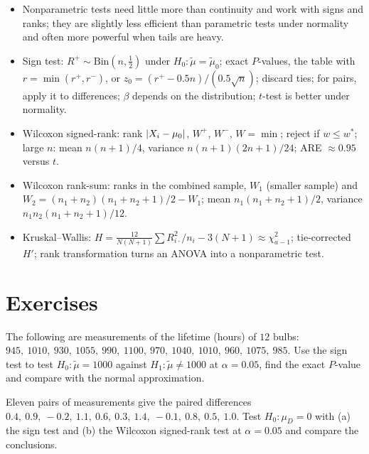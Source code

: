 \begin{summarybox}
\begin{itemize}
  \item Nonparametric tests need little more than continuity and work with signs and ranks; they are slightly less efficient than parametric tests under normality and often more powerful when tails are heavy.
  \item Sign test: $R^+\sim\mathrm{Bin}(n,\tfrac12)$ under $H_0:\tilde\mu=\tilde\mu_0$; exact $P$-values, the table with $r=\min(r^+,r^-)$, or $z_0=(r^+-0.5n)/(0.5\sqrt n)$; discard ties; for pairs, apply it to differences; $\beta$ depends on the distribution; $t$-test is better under normality.
  \item Wilcoxon signed-rank: rank $\lvert X_i-\mu_0\rvert$, $W^+$, $W^-$, $W=\min$; reject if $w\le w^*$; large $n$: mean $n(n+1)/4$, variance $n(n+1)(2n+1)/24$; ARE $\approx0.95$ versus $t$.
  \item Wilcoxon rank-sum: ranks in the combined sample, $W_1$ (smaller sample) and $W_2=(n_1+n_2)(n_1+n_2+1)/2-W_1$; mean $n_1(n_1+n_2+1)/2$, variance $n_1n_2(n_1+n_2+1)/12$.
  \item Kruskal--Wallis: $H=\frac{12}{N(N+1)}\sum R_{i\cdot}^2/n_i-3(N+1)\approx\chi^2_{a-1}$; tie-corrected $H'$; rank transformation turns an ANOVA into a nonparametric test.
\end{itemize}
\end{summarybox}

\section{Exercises}

\begin{exercise}
The following are measurements of the lifetime (hours) of $12$ bulbs: $945,\ 1010,\ 930,\ 1055,\ 990,\ 1100,\ 970,\ 1040,\ 1010,\ 960,\ 1075,\ 985$. Use the sign test to test $H_0:\tilde\mu=1000$ against $H_1:\tilde\mu\ne1000$ at $\alpha=0.05$, find the exact $P$-value and compare with the normal approximation.
\end{exercise}

\begin{exercise}
Eleven pairs of measurements give the paired differences $0.4,\ 0.9,\ -0.2,\ 1.1,\ 0.6,\ 0.3,\ 1.4,\ -0.1,\ 0.8,\ 0.5,\ 1.0$. Test $H_0:\mu_D=0$ with (a) the sign test and (b) the Wilcoxon signed-rank test at $\alpha=0.05$ and compare the conclusions.
\end{exercise}

